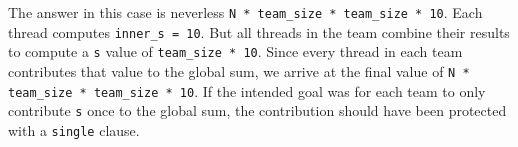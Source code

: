 The answer in this case is neverless \lstinline{N * team_size * team_size * 10}.
Each thread computes \lstinline{inner_s = 10}.
But all threads in the team combine their results to compute a \lstinline{s} value of \lstinline{team_size * 10}.
Since every thread in each team contributes that value to the global sum, we arrive at the final value of \lstinline{N * team_size * team_size * 10}. 
If the intended goal was for each team to only contribute \lstinline{s} once to the global sum, 
the contribution should have been protected with a \lstinline{single} clause.

